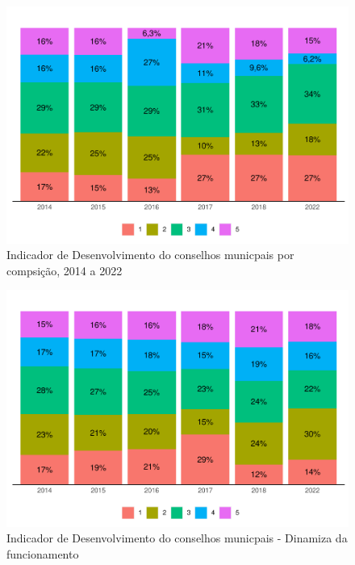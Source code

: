 \documentclass[
  brazilian]{report}
\begin{document}
\begin{figure}
\includegraphics{Censo-SUAS-2022_files/figure-latex/Id_per-1} \caption[Indicador de Desenvolvimento do conselhos municpais por compsição, 2014 a 2022]{Indicador de Desenvolvimento do conselhos municpais por compsição, 2014 a 2022}\label{fig:Id_per}
\end{figure}

\begin{figure}
\includegraphics{Censo-SUAS-2022_files/figure-latex/id_fun-1} \caption[Indicador de Desenvolvimento do conselhos municpais - Dinamiza da funcionamento]{Indicador de Desenvolvimento do conselhos municpais - Dinamiza da funcionamento}\label{fig:id_fun}
\end{figure}
\end{document}
